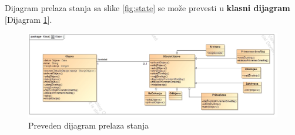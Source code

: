\par Dijagram prelaza stanja sa slike \ref{fig:state} se može prevesti u \textbf{klasni dijagram} [Dijagram \ref{fig:state-class}].
\begin{figure}
    \centering
    \includegraphics[height=0.5\textwidth, width=\textwidth]{img/state-class.jpg}
    \caption{Preveden dijagram prelaza stanja}
    \label{fig:state-class}
\end{figure}
